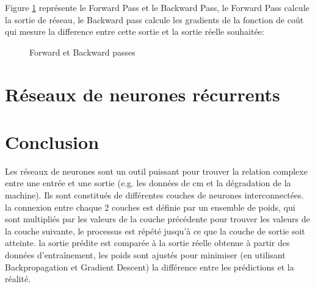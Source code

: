 Figure \ref{fig:forward-backward-pass} représente le Forward Pass et le Backward Pass, le Forward Pass calcule la sortie de réseau, le Backward pass calcule les gradients de la fonction de coût qui mesure la difference entre cette sortie et la sortie réelle souhaitée:

\begin{figure}[h]
    \centering
	
    \caption{Forward et Backward passes}
    \label{fig:forward-backward-pass}
\end{figure}


\section{Réseaux de neurones récurrents}

\section{Conclusion}
Les réseaux de neurones sont un outil puissant pour trouver la relation complexe entre une entrée et une sortie (e.g. les données de \acrlong{cm} et la dégradation de la machine). Ils sont constitués de différentes couches de neurones interconnectées. la connexion entre chaque 2 couches est définie par un ensemble de poids, qui sont multipliés par les valeurs de la couche précédente pour trouver les valeurs de la couche suivante, le processus est répété jusqu'à ce que la couche de sortie soit atteinte. la sortie prédite est comparée à la sortie réelle obtenue à partir des données d'entraînement, les poids sont ajustés pour minimiser (en utilisant Backpropagation et Gradient Descent) la différence entre les prédictions et la réalité.

\begin{comment}
    \begin{tikzpicture}
    \begin{axis}[
    hide axis,
    xlabel=$x$,ylabel=$y$,
    mesh/interior colormap name=hot,
    colormap/blackwhite,
    ]
    \addplot3 [domain=-1.5:1.5,surf]
    {-exp(-x^2-y^2)};
    \end{axis}
    \end{tikzpicture}

    \begin{tikzpicture}
        \begin{axis}[
        hide axis,
        xlabel=$x$,
        ylabel=$y$,
        ]
        \addplot3 [
        surf,
        mesh/interior colormap={blueblack}{
        color=(black) color=(blue)
        },
        samples=31,
        miter limit=1,
        mesh/interior colormap thresh=0.1,
        colormap/blackwhite,
        domain=0:1,
        ] {
        sin(deg(8*pi*x))* exp(-20*(y-0.5)^2)
        + exp(-(x-0.5)^2*30
        - (y-0.25)^2 - (x-0.5)*(y-0.25))
        };
        \end{axis}
        \end{tikzpicture}
\end{comment}